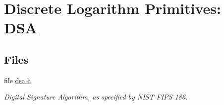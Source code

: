 \hypertarget{group__DL__dsa__m}{
\section{Discrete Logarithm Primitives: DSA}
\label{group__DL__dsa__m}
}
\subsection*{Files}
\begin{CompactItemize}
\item 
file \hyperlink{dsa_8h}{dsa.h}
\begin{CompactList}\small\item\em Digital Signature Algorithm, as specified by NIST FIPS 186. \item\end{CompactList}

\end{CompactItemize}
